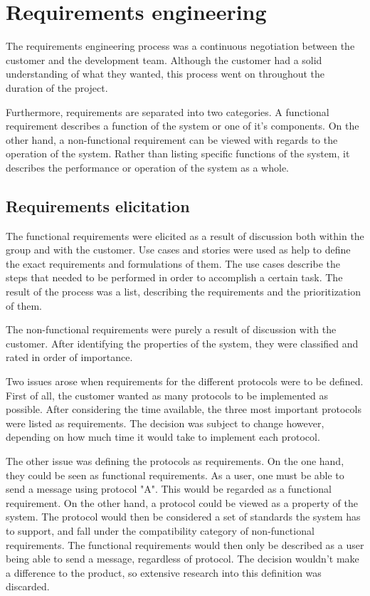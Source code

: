 
\chapter{Requirements engineering}

The requirements engineering process was a continuous negotiation between the customer and the development team. Although the customer had a solid understanding of what they wanted, this process went on throughout the duration of the project.

Furthermore, requirements are separated into two categories. A functional requirement describes a function of the system or one of it's components. On the other hand, a non-functional requirement can be viewed with regards to the operation of the system. Rather than listing specific functions of the system, it describes the performance or operation of the system as a whole.

\section{Requirements elicitation}

The functional requirements were elicited as a result of discussion both within the group and with the customer. Use cases and stories were used as help to define the exact requirements and formulations of them. The use cases describe the steps that needed to be performed in order to accomplish a certain task. The result of the process was a list, describing the requirements and the prioritization of them.

The non-functional requirements were purely a result of discussion with the customer. After identifying the properties of the system, they were classified and rated in order of importance.

Two issues arose when requirements for the different protocols were to be defined. First of all, the customer wanted as many protocols to be implemented as possible. After considering the time available, the three most important protocols were listed as requirements. The decision was subject to change however, depending on how much time it would take to implement each protocol.

The other issue was defining the protocols as requirements. On the one hand, they could be seen as functional requirements. As a user, one must be able to send a message using protocol "A". This would be regarded as a functional requirement. On the other hand, a protocol could be viewed as a property of the system. The protocol would then be considered a set of standards the system has to support, and fall under the compatibility category of non-functional requirements. The functional requirements would then only be described as a user being able to send a message, regardless of protocol. The decision wouldn't make a difference to the product, so extensive  research into this definition was discarded.


